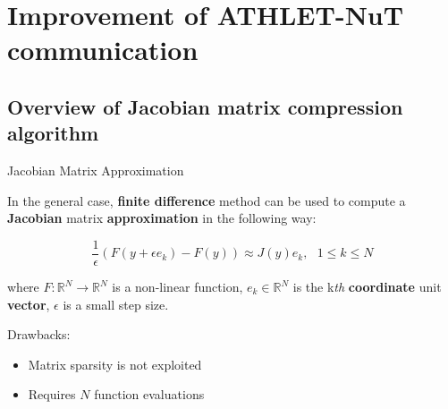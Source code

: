 \section{Improvement of ATHLET-NuT communication}
\subsection{Overview of Jacobian matrix compression algorithm}


\begin{frame}[t]{Jacobian Matrix Approximation}
    \spc
    \justifying
    
    In the general case, \textbf{finite difference} method can be used to compute a \textbf{Jacobian} matrix \textbf{approximation} in the following way:
    
    \begin{equation} \label{eq:matrix-compression-1}
	    \frac{1}{\epsilon} (F(y + \epsilon e_{k}) - F(y)) \approx J(y) e_{k}, \: \: \: 1 \leq k \leq N
    \end{equation}

    where $F : \mathbb{R}^{N} \rightarrow \mathbb{R}^{N}$  is a non-linear function, $e_{k} \in \mathbb{R}^{N}$ is the k\textit{th}  \textbf{coordinate} unit \textbf{vector}, $\epsilon$ is a small step size.\\
    
    \begin{block}{Drawbacks:}
        \begin{itemize}
            \item Matrix sparsity is not exploited
            \item Requires $N$ function evaluations
        \end{itemize}
    \end{block}
    
\end{frame}

